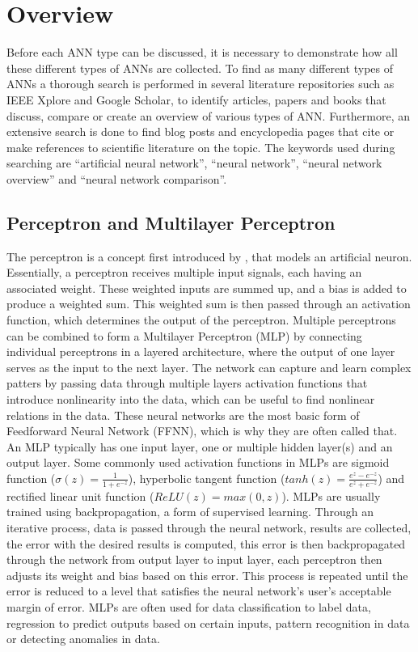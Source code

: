 \documentclass[conference]{IEEEtran}
\begin{document}
\section{Overview} \label{Overview}
Before each ANN type can be discussed, it is necessary to demonstrate how all these different types of ANNs are collected. To find as many different types of ANNs a thorough search is performed in several literature repositories such as IEEE Xplore and Google Scholar, to identify articles, papers and books that discuss, compare or create an overview of various types of ANN. Furthermore, an extensive search is done to find blog posts and encyclopedia pages that cite or make references to scientific literature on the topic. The keywords used during searching are ``artificial neural network'', ``neural network'', ``neural network overview'' and ``neural network comparison''.

\subsection{Perceptron and Multilayer Perceptron} \label{MLP}
The perceptron is a concept first introduced by \cite{rosenblatt1958perceptron}, that models an artificial neuron. Essentially, a perceptron receives multiple input signals, each having an associated weight. These weighted inputs are summed up, and a bias is added to produce a weighted sum. This weighted sum is then passed through an activation function, which determines the output of the perceptron. Multiple perceptrons can be combined to form a Multilayer Perceptron (MLP) by connecting individual perceptrons in a layered architecture, where the output of one layer serves as the input to the next layer. The network can capture and learn complex patters by passing data through multiple layers activation functions that introduce nonlinearity into the data, which can be useful to find nonlinear relations in the data. These neural networks are the most basic form of Feedforward Neural Network (FFNN), which is why they are often called that. An MLP typically has one input layer, one or multiple hidden layer(s) and an output layer. Some commonly used activation functions in MLPs are sigmoid function ($\sigma(z) = \frac{1}{1+e^{-z}}$), hyperbolic tangent function ($tanh(z) = \frac{e^z - e^{-z}}{e^z + e^{-z}}$) and rectified linear unit function ($ReLU(z) = max(0,z)$). MLPs are usually trained using backpropagation, a form of supervised learning. Through an iterative process, data is passed through the neural network, results are collected, the error with the desired results is computed, this error is then backpropagated through the network from output layer to input layer, each perceptron then adjusts its weight and bias based on this error. This process is repeated until the error is reduced to a level that satisfies the neural network's user's acceptable margin of error. MLPs are often used for data classification to label data, regression to predict outputs based on certain inputs, pattern recognition in data or detecting anomalies in data.
\end{document}
